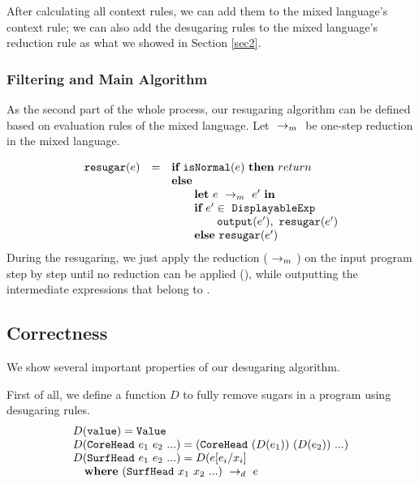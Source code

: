 After calculating all context rules, we can add them to the mixed language's context rule; we can also add the desugaring rules to the mixed language's reduction rule as what we showed in Section \ref{sec2}.


\subsubsection{Filtering and Main Algorithm}

As the second part of the whole process, our resugaring algorithm can be defined based on evaluation rules of the mixed language. Let $~\rightarrow_m~$ be one-step reduction in the mixed language.

\[
\begin{array}{llll}
\mbox{\tt resugar} (e) &=& \mbox{\rm \bf if}~\mbox{\tt isNormal}(e)~\mbox{\rm \bf then}~return\\
              & & \mbox{\rm \bf else}~\\
							& & \qquad \mbox{\rm \bf let}~e ~\rightarrow_m~e'~\mbox{\rm \bf in}\\
							& & \qquad \mbox{\rm \bf if}~e' \in~\mbox{\tt DisplayableExp} \\
							& & \qquad \qquad \mbox{\tt output}(e'),~\mbox{\tt resugar}(e')\\
							& & \qquad \mbox{\rm \bf else}~\mbox{\tt resugar}(e')
\end{array}
\]
During the resugaring, we just apply the reduction ($~\rightarrow_m~$) on the input program step by step until no reduction can be applied (), while outputting the intermediate expressions that belong to .


\subsection{Correctness}
\label{mark:correct}

We show several important properties of our desugaring algorithm.

First of all, we define a function $D$ to fully remove sugars in a program using desugaring rules.
\[
\begin{array}{lll}
D(\texttt{value}) = \texttt{Value}\\
D(\texttt{CoreHead}~e_1~e_2~ ...) = (\texttt{CoreHead}~(D(e_1))~(D(e_2))~...)\\
D(\texttt{SurfHead}~e_1~e_2~ ...) = D(e[e_i/x_i]\\
\quad \mbox{\bf where}~(\texttt{SurfHead}~x_1~x_2~ ...) ~\rightarrow_d~ e
\end{array}
\]

